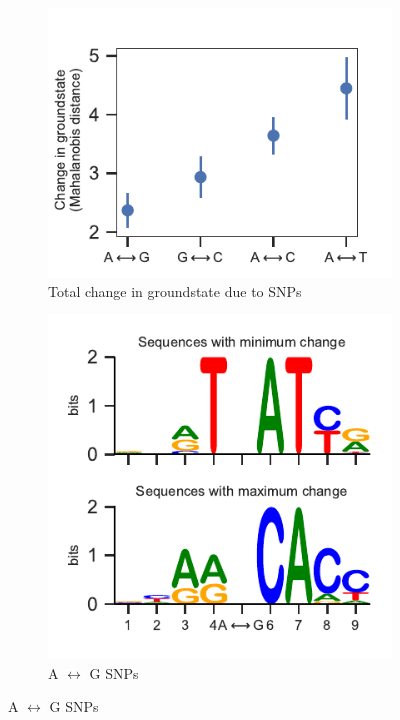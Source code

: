 \begin{figure}[p]
  \begin{subfigure}{15cm}
    \centering\includegraphics{images/SNIPS_errorbar.pdf}
    \centering\caption{Total change in groundstate due to SNPs}
    \end{subfigure}
  \begin{subfigure}{7cm}
    \centering\includegraphics{images/SNIPS_seq_logo_AG.pdf}
    \centering\caption{A $\longleftrightarrow$ G SNPs}
    \end{subfigure}

\end{figure}
